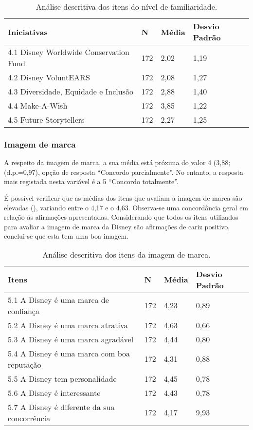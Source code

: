 \documentclass[portuguese]{textolivre}
\begin{document}
\begin{table}[h!]
\centering
\begin{threeparttable}
\caption{Análise descritiva dos itens do nível de familiaridade.}
\label{tab03}
\begin{tabular}{p{8cm} lll}
\toprule
 Iniciativas & N & \multicolumn{1}{p{1cm}}{Média} & \multicolumn{1}{p{1cm}}{Desvio Padrão} \\
 \midrule
4.1 Disney Worldwide Conservation Fund & 172 & 2,02 & 1,19 \\
4.2 Disney VoluntEARS & 172 & 2,08 & 1,27 \\
4.3 Diversidade, Equidade e Inclusão & 172 & 2,88 & 1,40 \\ 
4.4 Make-A-Wish & 172 & 3,85 & 1,22 \\
4.5 Future Storytellers & 172 & 2,27 & 1,25 \\
\bottomrule
\end{tabular}
\end{threeparttable}
\end{table}

\subsubsection{Imagem de marca}
A respeito da imagem de marca, a sua média está próxima do valor 4 (3,88; (d.p.=0,97), opção de resposta “Concordo parcialmente”. No entanto, a resposta mais registada nesta variável é a 5 “Concordo totalmente”. 

É possível verificar que as médias dos itens que avaliam a imagem de marca são elevadas (), variando entre o 4,17 e o 4,63. Observa-se uma concordância geral em relação ás afirmações apresentadas. Considerando que todos os itens utilizados para avaliar a imagem de marca da Disney são afirmações de cariz positivo, conclui-se que esta tem uma boa imagem.

\begin{table}[h!]
\centering
\begin{threeparttable}
\caption{Análise descritiva dos itens da imagem de marca.}
\label{tab04}
\begin{tabular}{p{8cm} lll}
\toprule
 Itens & N & \multicolumn{1}{p{1cm}}{Média} & \multicolumn{1}{p{1cm}}{Desvio Padrão} \\
 \midrule
5.1 A Disney é uma marca de confiança & 172 & 4,23 & 0,89 \\
5.2 A Disney é uma marca atrativa & 172 & 4,63 & 0,66 \\
5.3 A Disney é uma marca agradável & 172 & 4,44 & 0,80 \\
5.4 A Disney é uma marca com boa reputação & 172 & 4,31 & 0,88 \\
5.5 A Disney tem personalidade & 172 & 4,45 & 0,78 \\
5.6 A Disney é interessante & 172 & 4,43 & 0,78 \\
5.7 A Disney é diferente da sua concorrência & 172 & 4,17 & 9,93 \\
\bottomrule
\end{tabular}
\end{threeparttable}
\end{table}
\end{document}
